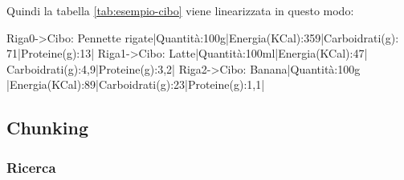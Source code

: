 Quindi la tabella \ref{tab:esempio-cibo} viene linearizzata in questo modo:
\begin{tcolorbox}[colback=white, colframe=black]
    Riga0->Cibo: Pennette rigate|Quantità:100g|Energia(KCal):359|Carboidrati(g): \\
    71|Proteine(g):13| Riga1->Cibo: Latte|Quantità:100ml|Energia(KCal):47| \\
    Carboidrati(g):4,9|Proteine(g):3,2| Riga2->Cibo: Banana|Quantità:100g \\
    |Energia(KCal):89|Carboidrati(g):23|Proteine(g):1,1|
\end{tcolorbox}

\subsection{Chunking}

\subsubsection{Ricerca}